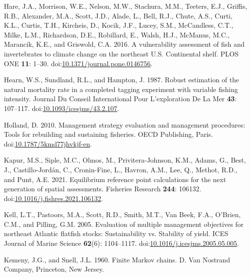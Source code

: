 \begin{CSLReferences}{1}{0}
\leavevmode{}%
Hare, J.A., Morrison, W.E., Nelson, M.W., Stachura, M.M., Teeters, E.J., Griffis, R.B., Alexander, M.A., Scott, J.D., Alade, L., Bell, R.J., Chute, A.S., Curti, K.L., Curtis, T.H., Kircheis, D., Kocik, J.F., Lucey, S.M., McCandless, C.T., Milke, L.M., Richardson, D.E., Robillard, E., Walsh, H.J., McManus, M.C., Marancik, K.E., and Griswold, C.A. 2016. A vulnerability assessment of fish and invertebrates to climate change on the northeast {U}.{S}. Continental shelf. PLOS ONE \textbf{11}: 1--30. doi:\href{https://doi.org/10.1371/journal.pone.0146756}{10.1371/journal.pone.0146756}.

\leavevmode{}%
Hearn, W.S., Sundland, R.L., and Hampton, J. 1987. Robust estimation of the natural mortality rate in a completed tagging experiment with variable fishing intensity. Journal Du Conseil International Pour L'exploration De La Mer \textbf{43}: 107--117. doi:\href{https://doi.org/10.1093/icesjms/43.2.107}{10.1093/icesjms/43.2.107}.

\leavevmode{}%
Holland, D. 2010. Management strategy evaluation and management procedures: Tools for rebuilding and sustaining fisheries. OECD Publishing, Paris. doi:\href{https://doi.org/10.1787/5kmd77jhvkjf-en}{10.1787/5kmd77jhvkjf-en}.

\leavevmode{}%
Kapur, M.S., Siple, M.C., Olmos, M., Privitera-Johnson, K.M., Adams, G., Best, J., Castillo-Jordán, C., Cronin-Fine, L., Havron, A.M., Lee, Q., Methot, R.D., and Punt, A.E. 2021. Equilibrium reference point calculations for the next generation of spatial assessments. Fisheries Research \textbf{244}: 106132. doi:\href{https://doi.org/10.1016/j.fishres.2021.106132}{10.1016/j.fishres.2021.106132}.

\leavevmode{}%
Kell, L.T., Pastoors, M.A., Scott, R.D., Smith, M.T., Van Beek, F.A., O'Brien, C.M., and Pilling, G.M. 2005. Evaluation of multiple management objectives for northeast {A}tlantic flatfish stocks: Sustainability vs. Stability of yield. ICES Journal of Marine Science \textbf{62}(6): 1104--1117. doi:\href{https://doi.org/10.1016/j.icesjms.2005.05.005}{10.1016/j.icesjms.2005.05.005}.

\leavevmode{}%
Kemeny, J.G., and Snell, J.L. 1960. Finite {M}arkov chains. D. Van Nostrand Company, Princeton, New Jersey.


\end{CSLReferences}
